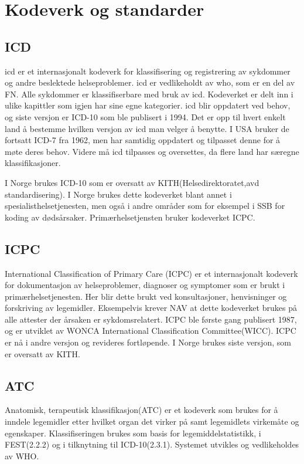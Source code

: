 \section{Kodeverk og standarder}
\subsection{ICD}
\gls{icd} er et internasjonalt kodeverk for klassifisering og registrering av sykdommer og andre beslektede helseproblemer. \gls{icd} er vedlikeholdt av \gls{who}, som er en del av FN. Alle sykdommer er klassifiserbare med bruk av \gls{icd}. Kodeverket er delt inn i ulike kapittler som igjen har sine egne kategorier. \gls{icd} blir oppdatert ved behov, og siste versjon er ICD-10 som ble publisert i 1994\citep{WHO_ICD}. Det er opp til hvert enkelt land å bestemme hvilken versjon av \gls{icd} man velger å benytte. I USA bruker de fortsatt ICD-7 fra 1962, men har samtidig oppdatert og tilpasset denne for å møte deres behov. Videre må \gls{icd} tilpasses og oversettes, da flere land har særegne klassifikasjoner.

I Norge brukes ICD-10 som er oversatt av KITH(Helsedirektoratet,avd standardisering). I Norge brukes dette kodeverket blant annet i spesialisthelsetjenesten, men også i andre områder som for eksempel i SSB for koding av dødsårsaker\citep{KITH_ICD}. Primærhelsetjensten bruker kodeverket ICPC.
\subsection{ICPC}
International Classification of Primary Care (ICPC) er et internasjonalt kodeverk for dokumentasjon av helseproblemer, diagnoser og symptomer som er brukt i primærhelsetjenesten. Her blir dette brukt ved konsultasjoner, henvisninger og forskriving av legemidler. Eksempelvis krever NAV at dette kodeverket brukes på alle attester der årsaken er sykdomsrelatert. ICPC ble første gang publisert 1987, og er utviklet av WONCA International Classification Committee(WICC). ICPC er nå i andre versjon og revideres fortløpende. I Norge brukes siste versjon, som er oversatt av KITH. 
\subsection{ATC}
Anatomisk, terapeutisk klassifikasjon(ATC) er et kodeverk som brukes for å inndele legemidler etter hvilket organ det virker på samt legemidlets virkemåte og egenskaper. Klassifiseringen brukes som basis for legemiddelstatistikk, i FEST(2.2.2) og i tilknytning til ICD-10(2.3.1). Systemet utvikles og vedlikeholdes av WHO.
